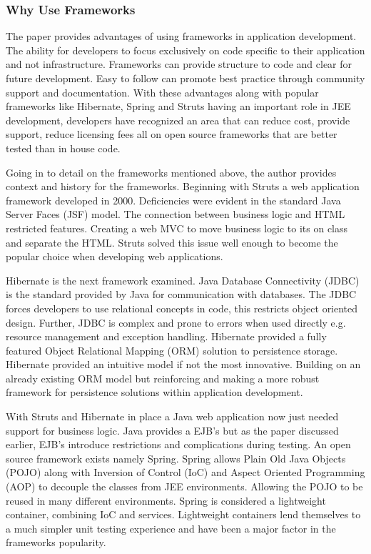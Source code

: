 \documentclass{article}
\begin{document}
		\subsubsection{Why Use Frameworks}
		The paper provides advantages of using frameworks in application development. The ability for developers to focus exclusively on code specific to their application and not infrastructure. Frameworks can provide structure to code and clear for future development. Easy to follow can promote best practice through community support and documentation. With these advantages along with popular frameworks like Hibernate, Spring and Struts having an important role in JEE development, developers have recognized an area that can reduce cost, provide support, reduce licensing fees all on open source frameworks that are better tested than in house code.
		
		Going in to detail on the frameworks mentioned above, the author provides context and history for the frameworks. Beginning with Struts a web application framework developed in 2000. Deficiencies were evident in the standard Java Server Faces (JSF) model. The connection between business logic and HTML restricted features. Creating a web MVC to move business logic to its on class and separate the HTML. Struts solved this issue well enough to become the popular choice when developing web applications. 
		
		Hibernate is the next framework examined. Java Database Connectivity (JDBC) is the standard provided by Java for communication with databases. The JDBC forces developers to use relational concepts in code, this restricts object oriented design. Further, JDBC is complex and prone to errors when used directly e.g. resource management and exception handling. Hibernate provided a fully featured Object Relational Mapping (ORM) solution to persistence storage. Hibernate provided an intuitive model if not the most innovative. Building on an already existing ORM model but reinforcing and making a more robust framework for persistence solutions within application development.
		
		With Struts and Hibernate in place a Java web application now just needed support for business logic. Java provides a EJB’s but as the paper discussed earlier, EJB’s introduce restrictions and complications during testing. An open source framework exists namely Spring. Spring allows Plain Old Java Objects (POJO) along with Inversion of Control (IoC) and Aspect Oriented Programming (AOP) to decouple the classes from JEE environments. Allowing the POJO to be reused in many different environments. Spring is considered a lightweight container, combining IoC and services. Lightweight containers lend themselves to a much simpler unit testing experience and have been a major factor in the frameworks popularity.
	
\end{document}

